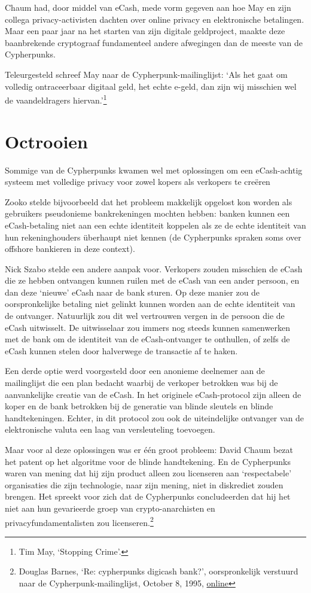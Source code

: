 \documentclass[
  a5paper,
  smalldemyvopaper,11pt,twoside,onecolumn,openright,extrafontsizes,
hidelinks]{memoir}
\begin{document}
Chaum had, door middel van eCash, mede vorm gegeven aan hoe May en zijn
collega privacy-activisten dachten over online privacy en elektronische
betalingen. Maar een paar jaar na het starten van zijn digitale
geldproject, maakte deze baanbrekende cryptograaf fundamenteel andere
afwegingen dan de meeste van de Cypherpunks.

Teleurgesteld schreef May naar de Cypherpunk-mailinglijst: `Als het gaat
om volledig ontraceerbaar digitaal geld, het echte e-geld, dan zijn wij
misschien wel de vaandeldragers hiervan.'\footnote{Tim May, `Stopping
  Crime'.}

\section{Octrooien}\label{octrooien}

Sommige van de Cypherpunks kwamen wel met oplossingen om een
eCash-achtig systeem met volledige privacy voor zowel kopers als
verkopers te creëren

Zooko stelde bijvoorbeeld dat het probleem makkelijk opgelost kon worden
als gebruikers pseudonieme bankrekeningen mochten hebben: banken kunnen
een eCash-betaling niet aan een echte identiteit koppelen als ze de
echte identiteit van hun rekeninghouders überhaupt niet kennen (de
Cypherpunks spraken soms over offshore bankieren in deze context).

Nick Szabo stelde een andere aanpak voor. Verkopers zouden misschien de
eCash die ze hebben ontvangen kunnen ruilen met de eCash van een ander
persoon, en dan deze `nieuwe' eCash naar de bank sturen. Op deze manier
zou de oorspronkelijke betaling niet gelinkt kunnen worden aan de echte
identiteit van de ontvanger. Natuurlijk zou dit wel vertrouwen vergen in
de persoon die de eCash uitwisselt. De uitwisselaar zou immers nog
steeds kunnen samenwerken met de bank om de identiteit van de
eCash-ontvanger te onthullen, of zelfs de eCash kunnen stelen door
halverwege de transactie af te haken.

Een derde optie werd voorgesteld door een anonieme deelnemer aan de
mailinglijst die een plan bedacht waarbij de verkoper betrokken was bij
de aanvankelijke creatie van de eCash. In het originele eCash-protocol
zijn alleen de koper en de bank betrokken bij de generatie van blinde
sleutels en blinde handtekeningen. Echter, in dit protocol zou ook de
uiteindelijke ontvanger van de elektronische valuta een laag van
versleuteling toevoegen.

Maar voor al deze oplossingen was er één groot probleem: David Chaum
bezat het patent op het algoritme voor de blinde handtekening. En de
Cypherpunks waren van mening dat hij zijn product alleen zou licenseren
aan `respectabele' organisaties die zijn technologie, naar zijn mening,
niet in diskrediet zouden brengen. Het spreekt voor zich dat de
Cypherpunks concludeerden dat hij het niet aan hun gevarieerde groep van
crypto-anarchisten en privacyfundamentalisten zou licenseren.\footnote{Douglas
  Barnes, `Re: cypherpunks digicash bank?', oorspronkelijk verstuurd
  naar de Cypherpunk-mailinglijst, October 8, 1995,
  \href{https://cypherpunks.venona.com/date/1995/10/msg00731.html}{online}}
\end{document}
